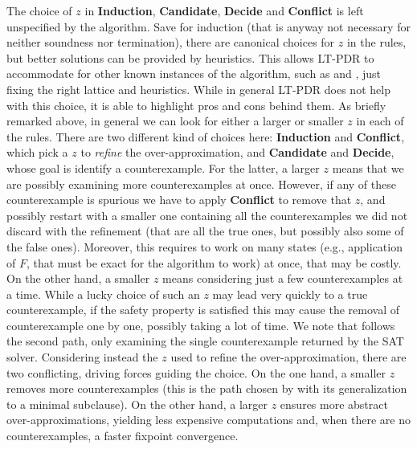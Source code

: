 The choice of $z$ in \textbf{Induction}, \textbf{Candidate}, \textbf{Decide} and \textbf{Conflict} is left unspecified by the algorithm. Save for induction (that is anyway not necessary for neither soundness nor termination), there are canonical choices for $z$ in the rules, but better solutions can be provided by heuristics. This allows LT-PDR to accommodate for other known instances of the algorithm, such as  and , just fixing the right lattice and heuristics.
While in general LT-PDR does not help with this choice, it is able to highlight pros and cons behind them. As briefly remarked above, in general we can look for either a larger or smaller $z$ in each of the rules. There are two different kind of choices here: \textbf{Induction} and \textbf{Conflict}, which pick a $z$ to \emph{refine} the over-approximation, and \textbf{Candidate} and \textbf{Decide}, whose goal is identify a counterexample.
For the latter, a larger $z$ means that we are possibly examining more counterexamples at once. However, if any of these counterexample is spurious we have to apply \textbf{Conflict} to remove that $z$, and possibly restart with a smaller one containing all the counterexamples we did not discard with the refinement (that are all the true ones, but possibly also some of the false ones). Moreover, this requires to work on many states (e.g., application of $F$, that must be exact for the algorithm to work) at once, that may be costly. On the other hand, a smaller $z$ means considering just a few counterexamples at a time. While a lucky choice of such an $z$ may lead very quickly to a true counterexample, if the safety property is satisfied this may cause the removal of counterexample one by one, possibly taking a lot of time. We note that  follows the second path, only examining the single counterexample returned by the SAT solver.
Considering instead the $z$ used to refine the over-approximation, there are two conflicting, driving forces guiding the choice. On the one hand, a smaller $z$ removes more counterexamples (this is the path chosen by  with its generalization to a minimal subclause). On the other hand, a larger $z$ ensures more abstract over-approximations, yielding less expensive computations and, when there are no counterexamples, a faster fixpoint convergence.

